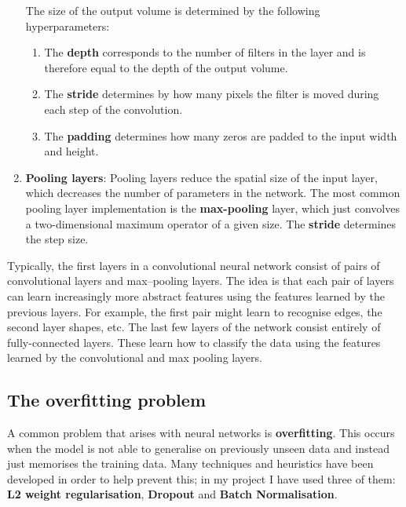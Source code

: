 \documentclass[12pt,a4paper,twoside,openright]{report}
\begin{document}
\begin{enumerate}
	The size of the output volume is determined by the following hyperparameters:
	\begin{enumerate}
		\item The \textbf{depth} corresponds to the number of filters in the layer and is therefore equal to the depth of the output volume.
		\item The \textbf{stride} determines by how many pixels the filter is moved during each step of the convolution.
		\item The \textbf{padding} determines how many zeros are padded to the input width and height.
	\end{enumerate}
	
	\item \textbf{Pooling layers}: Pooling layers reduce the spatial size of the input layer, which decreases the number of parameters in the network. The most common pooling layer implementation is the \textbf{max-pooling} layer, which just convolves a two-dimensional maximum operator of a given size. The \textbf{stride} determines the step size.

\end{enumerate}

Typically, the first layers in a convolutional neural network consist of pairs of convolutional layers and max--pooling layers. The idea is that each  pair of layers can learn increasingly more abstract features using the features learned by the previous layers. For example, the first pair might learn to recognise edges, the second layer shapes, etc. The last few layers of the network consist entirely of fully-connected layers. These learn how to classify the data using the features learned by the convolutional and max pooling layers.

\subsection{The overfitting problem}
A common problem that arises with neural networks is \textbf{overfitting}. This occurs when the model is not able to generalise on previously unseen data and instead just memorises the training data. Many techniques and heuristics have been developed in order to help prevent this; in my project I have used three of them: \textbf{L2 weight regularisation}, \textbf{Dropout} and \textbf{Batch Normalisation}.
\end{document}
